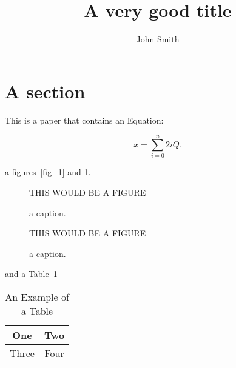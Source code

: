 \documentclass[crop=false]{standalone}
\begin{document}
\title{A very good title}
\author{John Smith}
\date{}
\maketitle

\section{A section}\label{section}
This is a paper that contains an Equation:

\begin{equation}
\label{eq1}
x = \sum_{i=0}^{n} 2{i} Q.
\end{equation}

a figures~\ref{fig_1} and \ref{fig_2}.

\begin{figure}[!t]
  \begin{minipage}{.49\linewidth}
\centering
THIS WOULD BE A FIGURE
\caption{a caption.}
\label{fig_1}
\end{minipage}%
 \begin{minipage}{.49\linewidth}
\centering
THIS WOULD BE A FIGURE
\caption{a caption.}
\label{fig_2}
\end{minipage}
\end{figure}

and a Table~\ref{table1}
\begin{table}[!t]
\caption{An Example of a Table\label{table1}}
\centering
\begin{tabular}{|c||c|}
\hline
One & Two\\
\hline
Three & Four\\
\hline
\end{tabular}
\end{table}



\end{document}
